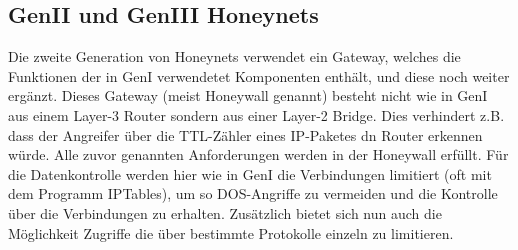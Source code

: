 \subsection{GenII und GenIII Honeynets}
Die zweite Generation von Honeynets verwendet ein Gateway, welches die Funktionen der in GenI verwendetet Komponenten enthält, und diese noch weiter ergänzt. Dieses Gateway (meist Honeywall genannt) besteht nicht wie in GenI aus einem Layer-3 Router sondern aus einer Layer-2 Bridge. Dies verhindert z.B. dass der Angreifer über die TTL-Zähler eines IP-Paketes dn Router erkennen würde. Alle zuvor genannten Anforderungen werden in der Honeywall erfüllt. Für die Datenkontrolle werden hier wie in GenI die Verbindungen limitiert (oft mit dem Programm IPTables), um so DOS-Angriffe zu vermeiden und die Kontrolle über die Verbindungen zu erhalten. Zusätzlich bietet sich nun auch die Möglichkeit Zugriffe die über bestimmte Protokolle einzeln zu limitieren.

